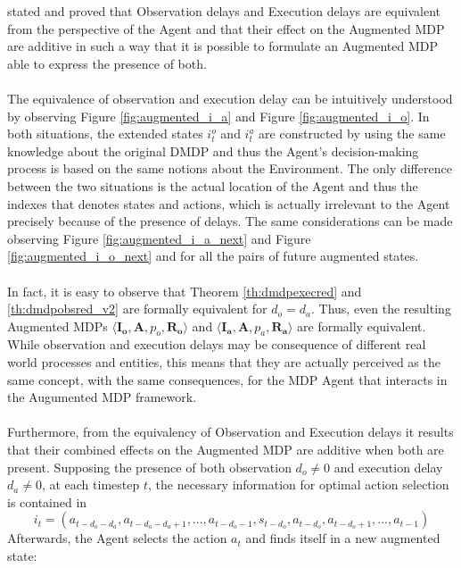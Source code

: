                  stated and proved that Observation delays and Execution delays are equivalent from the perspective of the Agent and that their effect on the Augmented MDP are additive in such a way that it is possible to formulate an Augmented MDP able to express the presence of both.
                \\\\
                The equivalence of observation and execution delay can be intuitively understood by observing Figure \ref{fig:augmented_i_a} and Figure \ref{fig:augmented_i_o}. In both situations, the extended states $i^o_t$ and $i^a_t$ are constructed by using the same knowledge about the original DMDP and thus the Agent's decision-making process is based on the same notions about the Environment. The only difference between the two situations is the actual location of the Agent and thus the indexes that denotes states and actions, which is actually irrelevant to the Agent precisely because of the presence of delays. The same considerations can be made observing Figure \ref{fig:augmented_i_a_next} and Figure \ref{fig:augmented_i_o_next} and for all the pairs of future augmented states.
                \\\\
                In fact, it is easy to observe that Theorem \ref{th:dmdpexecred} and \ref{th:dmdpobsred_v2} are formally equivalent for $d_o = d_a$. Thus, even the resulting Augmented MDPs $\langle \mathbf{I_o}, \mathbf{A}, p_o, \mathbf{R_o} \rangle$ and $\langle \mathbf{I_a}, \mathbf{A}, p_a, \mathbf{R_a} \rangle$ are formally equivalent. While observation and execution delays may be consequence of different real world processes and entities, this means that they are actually perceived as the same concept, with the same consequences, for the MDP Agent that interacts in the Augumented MDP framework.
                \\\\
                Furthermore, from the equivalency of Observation and Execution delays it results that their combined effects on the Augmented MDP are additive when both are present. Supposing the presence of both observation $d_o \neq 0$ and execution delay $d_a \neq 0$, at each timestep $t$, the necessary information for optimal action selection is contained in 
                \[i_t = \left( a_{t-d_{o}-d_{a}}, a_{t-d_{o}-d_{a} +1}, ..., a_{t-d_{o}-1}, s_{t-d_{o}}, a_{t-d_{o}}, a_{t-d_{o}+1}, ..., a_{t-1} \right)\] 
                \noindent
                Afterwards, the Agent selects the action $a_t$ and finds itself in a new augmented state: 
